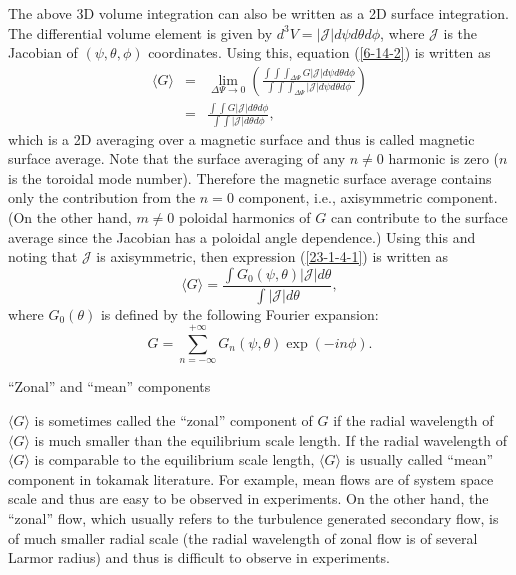\documentclass{llncs}
\begin{document}
The above 3D volume integration can also be written as a 2D surface
integration. The differential volume element is given by $d^3 V = |
\mathcal{J} | d \psi d \theta d \phi$, where $\mathcal{J}$ is the Jacobian of
$(\psi, \theta, \phi)$ coordinates. Using this, equation (\ref{6-14-2}) is
written as
\begin{eqnarray}
  \langle G \rangle & = & \lim_{\Delta \Psi \rightarrow 0} \left( \frac{\int
  \int \int_{\Delta \Psi} G | \mathcal{J} | d \psi d \theta d \phi}{\int \int
  \int_{\Delta \Psi} | \mathcal{J} | d \psi d \theta d \phi} \right)
  \nonumber\\
  & = & \frac{\int \int G | \mathcal{J} | d \theta d \phi}{\int \int |
  \mathcal{J} | d \theta d \phi},  \label{23-1-4-1}
\end{eqnarray}
which is a 2D averaging over a magnetic surface and thus is called magnetic
surface average. Note that the surface averaging of any $n \neq 0$ harmonic is
zero ($n$ is the toroidal mode number). Therefore the magnetic surface average
contains only the contribution from the $n = 0$ component, i.e., axisymmetric
component. (On the other hand, $m \neq 0$ poloidal harmonics of $G$ can
contribute to the surface average since the Jacobian has a poloidal angle
dependence.) Using this and noting that $\mathcal{J}$ is axisymmetric, then
expression (\ref{23-1-4-1}) is written as
\begin{equation}
  \langle G \rangle = \frac{\int G_0 (\psi, \theta) | \mathcal{J} | d
  \theta}{\int | \mathcal{J} | d \theta},
\end{equation}
where $G_0 (\theta)$ is defined by the following Fourier expansion:
\begin{equation}
  G = \sum_{n = - \infty}^{+ \infty} G_n (\psi, \theta) \exp (- i n \phi) .
\end{equation}


\hrulefill

``Zonal'' and ``mean'' components

$\langle G \rangle$ is sometimes called the ``zonal'' component of $G$ if the
radial wavelength of $\langle G \rangle$ is much smaller than the equilibrium
scale length. If the radial wavelength of $\langle G \rangle$ is comparable to
the equilibrium scale length, $\langle G \rangle$ is usually called ``mean''
component in tokamak literature. For example, mean flows are of system space
scale and thus are easy to be observed in experiments. On the other hand, the
``zonal'' flow, which usually refers to the turbulence generated secondary
flow, is of much smaller radial scale (the radial wavelength of zonal flow is
of several Larmor radius) and thus is difficult to observe in experiments.
\end{document}

